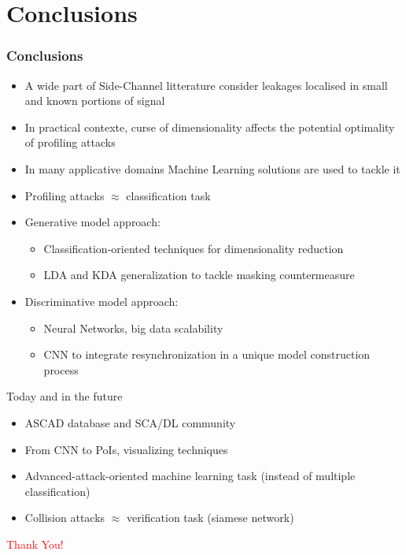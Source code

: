 
\section{Conclusions}

\begin{frame}
\frametitle{Conclusions}
\vspace{-10pt}
\begin{itemize}
\item A wide part of Side-Channel litterature consider leakages localised in small and known portions of signal
\item In practical contexte, curse of dimensionality affects the potential optimality of profiling attacks
\item In many applicative domains Machine Learning solutions are used to tackle it
\item Profiling attacks $\approx$ classification task
\item Generative model approach:
\begin{itemize}
\item Classification-oriented techniques for dimensionality reduction 
\item LDA and KDA generalization to tackle masking countermeasure
\end{itemize}
\item Discriminative model approach:
\begin{itemize}
\item Neural Networks, big data scalability
\item CNN to integrate resynchronization in a unique model construction process
\end{itemize}
\end{itemize}
\pause
\begin{block}{Today and in the future}
\begin{itemize}
\item ASCAD database and SCA/DL community
\item From CNN to PoIs, visualizing techniques
\item Advanced-attack-oriented machine learning task (instead of multiple classification)
\item Collision attacks $\approx$ verification task (siamese network)
\end{itemize}
\end{block}
\pause
\vspace{30pt}
\begin{huge}
\textcolor{red}{\hfill Thank You!}
\end{huge}

\end{frame}

